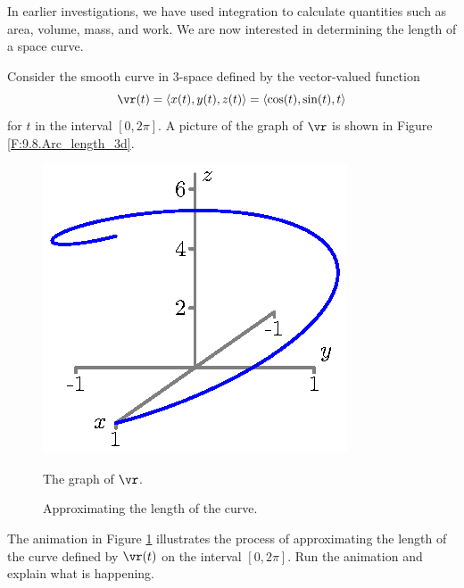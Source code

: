 \begin{pa} \label{PA:9.8} In earlier investigations, we have used
  integration to calculate quantities such as area, volume, mass, and
  work.  We are now interested in determining the 
  length of a space curve.

  Consider the smooth curve in 3-space defined by the vector-valued
  function
    \[\vr(t) = \langle x(t), y(t), z(t) \rangle = \langle \cos(t), \sin(t), t \rangle\]
    for $t$ in the interval $[0,2\pi]$. A picture of the graph of $\vr$ is shown in Figure \ref{F:9.8.Arc_length_3d}.
\begin{figure}[ht]
\begin{center}
\begin{minipage}{2.5in}
\begin{center}
\includegraphics{figures/fig_9_8_length_1.eps}
\end{center}
\caption{The graph of $\vr$.}
\label{F:9.8.Arc_length_3d}
\end{minipage} \hspace{0.5in}
\begin{minipage}{2.5in}
\begin{center}
\end{center}
\caption{Approximating the length of the curve.}
\label{F:9.8.Arc_length_3d_animation}
\end{minipage}
\end{center}
\end{figure}
    \ba
    \item The animation in Figure \ref{F:9.8.Arc_length_3d_animation} illustrates the process of approximating the length of the curve defined by $\vr(t)$ on the interval $[0,2\pi]$. Run the animation and explain what is happening.


\end{pa}
